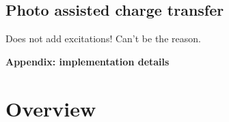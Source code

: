 \documentclass[a4paper,twocolumn]{revtex4-1} %
\begin{document}
\subsection{Photo assisted charge transfer}
Does not add excitations! Can't be the reason.















\renewcommand{\theequation}{S\arabic{equation}}
\setcounter{equation}{0}
\renewcommand{\thefigure}{S\arabic{figure}}
\setcounter{figure}{0}
\setcounter{section}{0}

\clearpage

\onecolumngrid
\begin{center}
\textbf{\large Appendix: implementation details}

\vspace{0.4cm}


\end{center}
\vspace{\columnsep}


\section{Overview}
\end{document}
